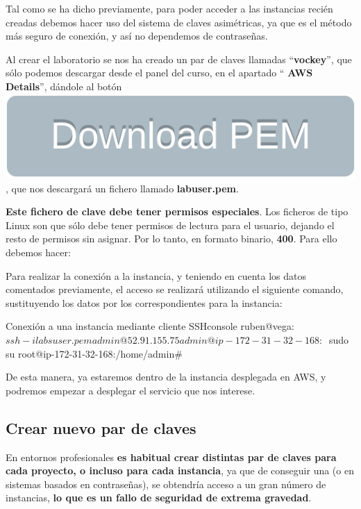 Tal como se ha dicho previamente, para poder acceder a las instancias recién creadas debemos hacer uso del sistema de claves asimétricas, ya que es el método más seguro de conexión, y así no dependemos de contraseñas.

Al crear el laboratorio se nos ha creado un par de claves llamadas “\textbf{vockey}”, que sólo podemos descargar desde el panel del curso, en el apartado “\faInfo  \textbf{ AWS Details}”, dándole al botón \includegraphics[height=0.8\baselineskip]{img/aws/ec2_download_pem.png}, que nos descargará un fichero llamado \textbf{labuser.pem}.

\textbf{Este fichero de clave debe tener permisos especiales}. Los ficheros de tipo Linux son que sólo debe tener permisos de lectura para el usuario, dejando el resto de permisos sin asignar. Por lo tanto, en formato binario, \textbf{400}. Para ello debemos hacer:


Para realizar la conexión a la instancia, y teniendo en cuenta los datos comentados previamente, el acceso se realizará utilizando el siguiente comando, sustituyendo los datos por los correspondientes para la instancia:

\begin{mycode}{Conexión a una instancia mediante cliente SSH}{console}{}
ruben@vega:~$ ssh -i labsuser.pem admin@52.91.155.75 
admin@ip-172-31-32-168:~$ sudo su
root@ip-172-31-32-168:/home/admin#
\end{mycode}

De esta manera, ya estaremos dentro de la instancia desplegada en AWS, y podremos empezar a desplegar el servicio que nos interese.


\subsection{Crear nuevo par de claves}
En entornos profesionales \textbf{es habitual crear distintas par de claves para cada proyecto, o incluso para cada instancia}, ya que de conseguir una (o en sistemas basados en contraseñas), se obtendría acceso a un gran número de instancias, \textbf{lo que es un fallo de seguridad de extrema gravedad}.

